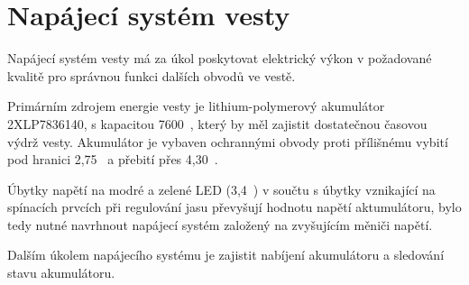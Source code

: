 \chapter{Napájecí systém vesty}
Napájecí systém vesty má za úkol poskytovat elektrický výkon v požadované kvalitě pro správnou funkci dalších obvodů ve vestě.

Primárním zdrojem energie vesty je lithium-polymerový akumulátor 2XLP7836140, s kapacitou 7600~, který by měl zajistit dostatečnou časovou výdrž vesty. Akumulátor je vybaven ochrannými obvody proti přílišnému vybití pod hranici 2,75~ a přebití přes 4,30~.

Úbytky napětí na modré a zelené LED (3,4~) v součtu s úbytky vznikající na spínacích prvcích při regulování jasu převyšují hodnotu napětí aktumulátoru, bylo tedy nutné navrhnout napájecí systém založený na zvyšujícím měniči napětí.

Dalším úkolem napájecího systému je zajistit nabíjení akumulátoru a sledování stavu akumulátoru.

